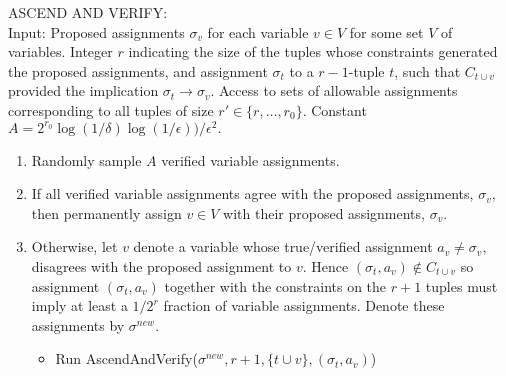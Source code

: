 \documentclass[anon,12pt]{colt2018}
\newcommand{\eps}{\epsilon}
\begin{document}
\vspace{-.4cm}\begin{algorithm}[H]
ASCEND AND VERIFY:\\
Input: Proposed assignments $\sigma_v$ for each variable $v \in V$ for some set $V$ of variables.  Integer $r$ indicating the size of the tuples whose constraints generated the proposed assignments, and assignment $\sigma_t$ to a $r-1$-tuple $t$, such that $C_{t \cup v}$ provided the implication $\sigma_t \rightarrow \sigma_v$.  Access to sets of allowable assignments corresponding to all tuples of size $r' \in \{r,\ldots,r_0\}$.  Constant $A = 2^{r_0}\log (1/\delta)\log(1/\eps))/\eps^2.$
\begin{enumerate}
\vspace{-.2cm}\item Randomly sample $A$ verified variable assignments.
\vspace{-.2cm}\item If all verified variable assignments agree with the proposed assignments, $\sigma_v$, then permanently assign $v\in V$ with their proposed assignments, $\sigma_v$.
\vspace{-.2cm}\item Otherwise, let $v$ denote a variable whose true/verified assignment $a_v \neq \sigma_v$, disagrees with the proposed assignment to $v$.  Hence $(\sigma_t,a_v) \not \in C_{t \cup v}$ so assignment $(\sigma_t,a_v)$ together with the constraints on the $r+1$ tuples must imply at least a $1/2^r$ fraction of variable assignments.  Denote these assignments by $\sigma^{new}$.
\begin{itemize}
\item Run  AscendAndVerify($\sigma^{new}, r+1,\{t \cup v\},(\sigma_t,a_v)$)
\end{itemize}
\end{enumerate}
\end{algorithm}
\end{document}
